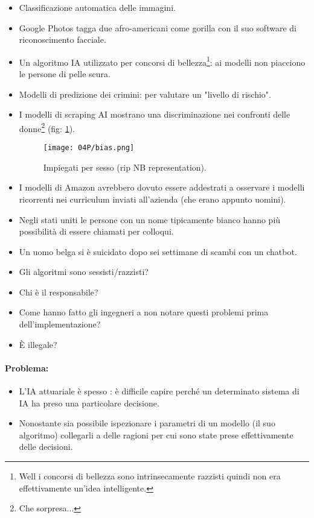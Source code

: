 \begin{itemize}
  \item Classificazione automatica delle immagini. 
  \item Google Photos tagga due afro-americani come gorilla con il suo software di riconoscimento facciale. 
  \item Un algoritmo IA utilizzato per concorsi di bellezza\footnote{Well i concorsi di bellezza sono intrinsecamente razzisti quindi non era effettivamente un'idea intelligente.}: ai modelli non piacciono le persone di pelle scura.
  \item Modelli di predizione dei crimini: per valutare un "livello di rischio". 
  \item I modelli di scraping AI mostrano una discriminazione nei confronti delle donne\footnote{Che sorpresa...} (fig: \ref{fig:bias}).
    \begin{figure}[h]
    \centering
    \texttt{[image: 04P/bias.png]}
    \caption{Impiegati per sesso (rip NB representation).}
    \label{fig:bias}
\end{figure}
\item I modelli di Amazon avrebbero dovuto essere addestrati a osservare i modelli ricorrenti nei curriculum inviati all'azienda (che erano appunto uomini). 
\item Negli stati uniti le persone con un nome tipicamente bianco hanno più possibilità di essere chiamati per colloqui.
\item Un uomo belga si è suicidato dopo sei settimane di scambi con un chatbot.
\end{itemize}


\begin{itemize}
  \item Gli algoritmi sono sessisti/razzisti? 
  \item Chi è il responsabile?
  \item Come hanno fatto gli ingegneri a non notare questi problemi prima dell'implementazione? 
  \item È illegale?
\end{itemize}

\paragraph{Problema:}

\begin{itemize}
  \item L'IA attuariale è spesso : è difficile capire perché un determinato sistema di IA ha preso una particolare decisione. 
  \item Nonostante sia possibile ispezionare i parametri di un modello (il suo algoritmo) collegarli a delle ragioni per cui sono state prese effettivamente delle decisioni. 
\end{itemize}

